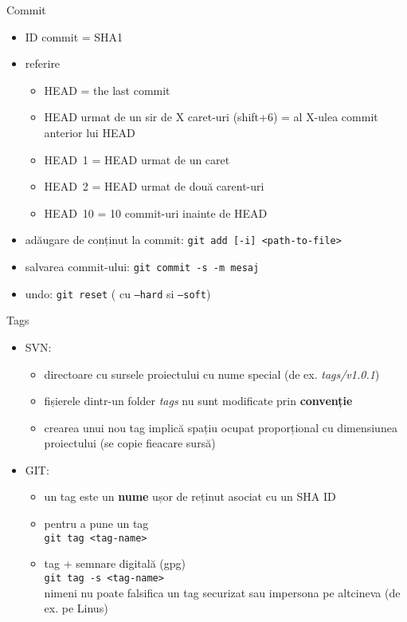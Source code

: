 \documentclass{beamer}
\begin{document}
\begin{frame}{Commit}
\begin{itemize} %
\item ID commit = SHA1
\item referire
\begin{itemize}
	\item HEAD = the last commit
	\item HEAD urmat de un sir de X caret-uri (shift+6) = al X-ulea commit anterior lui HEAD
	\item HEAD~1 = HEAD urmat de un caret
    \item HEAD~2 = HEAD urmat de două carent-uri
    \item HEAD~10 = 10 commit-uri inainte de HEAD
\end{itemize}
\pause\item adăugare de conținut la commit: \texttt{git add [-i] <path-to-file>}
\item salvarea commit-ului: \texttt{git commit -s -m mesaj}
\item undo: \texttt{git reset} ( cu \texttt{--hard} si \texttt{--soft})
\end{itemize}
\end{frame}


\begin{frame}{Tags}
\begin{itemize}[<+->]
\item SVN:
  \begin{itemize}
  \item directoare cu sursele proiectului cu nume special
    (de ex. \textit{tags/v1.0.1})
  \item fișierele dintr-un folder \textit{tags} nu sunt modificate prin \textbf{convenție}
  \item crearea unui nou tag implică spațiu ocupat proporțional cu 
    dimensiunea proiectului (se copie fieacare sursă)
  \end{itemize}
\item GIT:
  \begin{itemize}
  \item un tag este un \textbf{nume} ușor de reținut asociat cu un SHA ID
  \item pentru a pune un tag \\ 
    \texttt{git tag <tag-name>}
  \item tag + semnare digitală (gpg) \\ 
    \texttt{git tag -s <tag-name>}   \\
    nimeni nu poate falsifica un tag securizat sau impersona pe altcineva (de ex. pe Linus)
  \end{itemize}
\end{itemize}
\end{frame}
\end{document}
